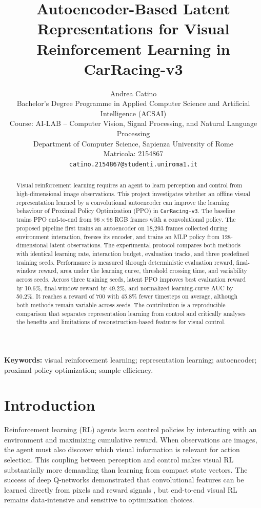 \documentclass[10pt,twocolumn,a4paper]{article}
\title{\textbf{Autoencoder-Based Latent Representations for Visual Reinforcement Learning in CarRacing-v3}}
\author{
  Andrea Catino\\
  Bachelor's Degree Programme in Applied Computer Science and Artificial Intelligence (ACSAI)\\
  Course: AI-LAB -- Computer Vision, Signal Processing, and Natural Language Processing\\
  Department of Computer Science, Sapienza University of Rome\\
  Matricola: 2154867\\
  \texttt{catino.2154867@studenti.uniroma1.it}
}
\date{}
\begin{document}
\maketitle

\begin{abstract}
Visual reinforcement learning requires an agent to learn perception and control
from high-dimensional image observations. This project investigates whether an
offline visual representation learned by a convolutional autoencoder can improve
the learning behaviour of Proximal Policy Optimization (PPO) in
\texttt{CarRacing-v3}. The baseline trains PPO end-to-end from $96\times96$ RGB
frames with a convolutional policy. The proposed pipeline first trains an
autoencoder on 18,293 frames collected during environment interaction, freezes
its encoder, and trains an MLP policy from 128-dimensional latent observations.
The experimental protocol compares both methods with identical learning rate,
interaction budget, evaluation tracks, and three predefined training seeds.
Performance is measured through deterministic evaluation reward, final-window
reward, area under the learning curve, threshold crossing time, and variability
across seeds. Across three training seeds, latent PPO improves best evaluation
reward by 10.6\%, final-window reward by 49.2\%, and normalized learning-curve
AUC by 50.2\%. It reaches a reward of 700 with 45.8\% fewer timesteps on
average, although both methods remain variable across seeds. The contribution
is a reproducible comparison that separates representation learning from
control and critically analyses the benefits and limitations of
reconstruction-based features for visual control.
\end{abstract}

\noindent\textbf{Keywords:} visual reinforcement learning; representation
learning; autoencoder; proximal policy optimization; sample efficiency.

\section{Introduction}

Reinforcement learning (RL) agents learn control policies by interacting with an
environment and maximizing cumulative reward. When observations are images, the
agent must also discover which visual information is relevant for action
selection. This coupling between perception and control makes visual RL
substantially more demanding than learning from compact state vectors. The
success of deep Q-networks demonstrated that convolutional features can be
learned directly from pixels and reward signals \cite{mnih2015human}, but
end-to-end visual RL remains data-intensive and sensitive to optimization
choices.
\end{document}
